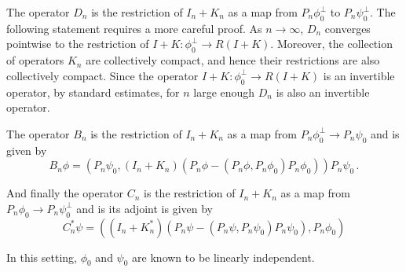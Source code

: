 The operator $D_{n}$ is the restriction of $I_{n} + K_{n}$ 
as a map from $P_{n} \phi_{0}^{\perp}$ 
to $P_{n} \psi_{0}^{\perp}$.
The following statement requires a more careful proof.
{\color{red} As $n \to \infty$, $D_{n}$ converges pointwise to the restriction
of $I + K: \phi_{0}^{\perp} \to R(I+K)$. Moreover, the collection
of operators $K_{n}$ are collectively compact, and hence their restrictions
are also collectively compact. 
Since the operator $I+K: \phi_{0}^{\perp} \to R(I+K)$ is an invertible
operator, by standard estimates, for $n$ large enough $D_{n}$ is also 
an invertible operator.}

The operator $B_{n}$ is the restriction of $I_{n} + K_{n}$ as a map from 
$P_{n} \phi_{0} ^{\perp} \to P_{n} \psi_{0}$ and is given by
\begin{equation}
B_{n} \phi = \left( P_{n} \psi_{0}, (I_{n} + K_{n}) 
(P_{n} \phi -( P_{n} \phi, P_{n} \phi_{0}) P_{n} \phi_{0}) \right) P_{n} \psi_{0}  \, .
\end{equation}

And finally the operator $C_{n}$ is the restriction of $I_{n} + K_{n}$ as a map from
$P_{n} \phi_{0} \to P_{n} \psi_{0}^{\perp}$ and is its adjoint is given by
\begin{equation}
C_{n}^{\ast}\psi = \left( (I_{n} + K_{n}^{\ast}) \left(P_{n} \psi - (P_{n} \psi, P_{n} \psi_{0}) P_{n} \psi_{0} \right), P_{n} \phi_{0} \right)
\end{equation}

In this setting, $\phi_{0}$ and $\psi_{0}$ are known to be linearly independent.


